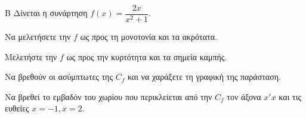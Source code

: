 \begin{thema}{Β}
Δίνεται η συνάρτηση $f(x)=\dfrac{2x}{x^2+1}$.
\begin{erwthma}
\item Να μελετήσετε την $f$ ως προς τη μονοτονία και τα ακρότατα.
\item Μελετήστε την $f$ ως προς την κυρτότητα και τα σημεία καμπής.
\item Να βρεθούν οι ασύμπτωτες της $C_f$ και να χαράξετε τη γραφική της παράσταση.
\item Να βρεθεί το εμβαδόν του χωρίου που περικλείεται από την $C_f$ τον άξονα $x'x$ και τις ευθείες $x=-1,x=2$.
\end{erwthma}
\end{thema}

